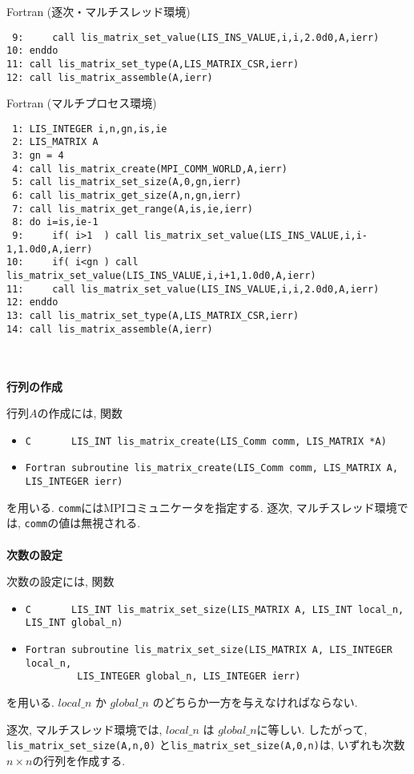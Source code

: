 \documentclass[a4paper]{jarticle}
\begin{document}
{{\begin{itembox}[l]{Fortran (逐次・マルチスレッド環境)}
\begin{verbatim}
 9:     call lis_matrix_set_value(LIS_INS_VALUE,i,i,2.0d0,A,ierr)
10: enddo
11: call lis_matrix_set_type(A,LIS_MATRIX_CSR,ierr)
12: call lis_matrix_assemble(A,ierr)
\end{verbatim}
\end{itembox}
\begin{itembox}[l]{Fortran (マルチプロセス環境)}
\small
\begin{verbatim}
 1: LIS_INTEGER i,n,gn,is,ie                 
 2: LIS_MATRIX A
 3: gn = 4
 4: call lis_matrix_create(MPI_COMM_WORLD,A,ierr)
 5: call lis_matrix_set_size(A,0,gn,ierr)
 6: call lis_matrix_get_size(A,n,gn,ierr)
 7: call lis_matrix_get_range(A,is,ie,ierr)
 8: do i=is,ie-1
 9:     if( i>1  ) call lis_matrix_set_value(LIS_INS_VALUE,i,i-1,1.0d0,A,ierr)
10:     if( i<gn ) call lis_matrix_set_value(LIS_INS_VALUE,i,i+1,1.0d0,A,ierr)
11:     call lis_matrix_set_value(LIS_INS_VALUE,i,i,2.0d0,A,ierr)
12: enddo
13: call lis_matrix_set_type(A,LIS_MATRIX_CSR,ierr)
14: call lis_matrix_assemble(A,ierr)
\end{verbatim}
\end{itembox}
\\ \\
\noindent
{\bf 行列の作成}

行列$A$の作成には, 関数
\begin{itemize}
\item \verb|C       LIS_INT lis_matrix_create(LIS_Comm comm, LIS_MATRIX *A)|
\item \verb|Fortran subroutine lis_matrix_create(LIS_Comm comm, LIS_MATRIX A, LIS_INTEGER ierr)|
\end{itemize}
を用いる. 
{\tt comm}にはMPIコミュニケータを指定する. 逐次, マルチスレッド環境では, {\tt comm}の値は無視される. 
\\ \\
\noindent
{\bf 次数の設定}

次数の設定には, 関数
\begin{itemize}
\item \verb|C       LIS_INT lis_matrix_set_size(LIS_MATRIX A, LIS_INT local_n, LIS_INT global_n)|
\item \verb|Fortran subroutine lis_matrix_set_size(LIS_MATRIX A, LIS_INTEGER local_n,|\\
      \verb|         LIS_INTEGER global_n, LIS_INTEGER ierr)|
\end{itemize}
を用いる. 
$local\_n$ か $global\_n$ のどちらか一方を与えなければならない. 

逐次, マルチスレッド環境では, $local\_n$ $は$ $global\_n$に等しい. 
したがって, 
\verb|lis_matrix_set_size(A,n,0)|
と\verb|lis_matrix_set_size(A,0,n)|は, いずれも次数$n \times n$の行列を作成する. 

}}
\end{document}
